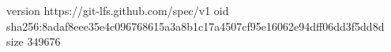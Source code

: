 version https://git-lfs.github.com/spec/v1
oid sha256:8adaf8eee35e4c096768615a3a8b1c17a4507cf95e16062e94dff06dd3f5dd8d
size 349676
